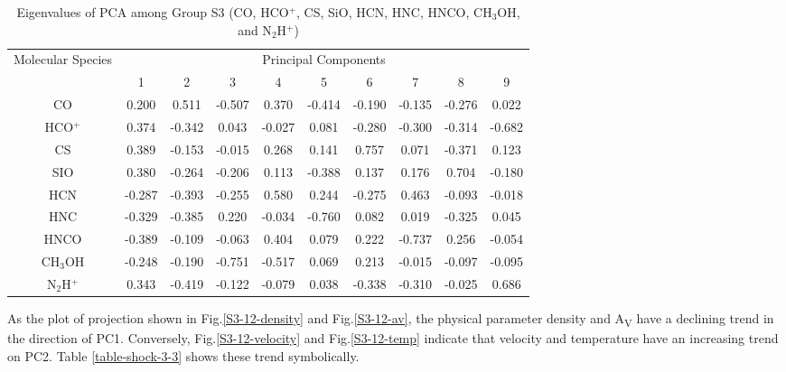 \documentclass{aa}
\begin{document}
\begin{CJK*}{UTF8}{gbsn}
\begin{table}[htbp]
\centering
\begin{tabular}{cccccccccc}
\hline\hline
\multirow{2}{*}{Molecular Species} & \multicolumn{9}{c}{Principal Components}                 \\ \cline{2-10} 
                                   & 1       & 2       & 3       & 4       & 5      & 6    & 7       & 8      & 9   \\ \hline
CO    & 0.200  & 0.511  & -0.507 & 0.370  & -0.414 & -0.190 & -0.135 & -0.276 & 0.022  \\ \hline
HCO$^+$     & 0.374  & -0.342 & 0.043  & -0.027  & 0.081   & -0.280 & -0.300    & -0.314 & -0.682  \\ \hline
CS    & 0.389  & -0.153 & -0.015 & 0.268  & 0.141  & 0.757  & 0.071  & -0.371 & 0.123 \\ \hline
SIO   & 0.380  & -0.264 & -0.206  & 0.113  & -0.388 & 0.137   & 0.176  & 0.704  & -0.180 \\ \hline
HCN   & -0.287 & -0.393 & -0.255 & 0.580  & 0.244  & -0.275 & 0.463  & -0.093 & -0.018 \\ \hline
HNC   & -0.329 & -0.385 & 0.220  & -0.034 & -0.760 & 0.082  & 0.019  & -0.325 & 0.045 \\ \hline
HNCO  & -0.389 & -0.109 & -0.063 & 0.404  & 0.079  & 0.222  & -0.737 & 0.256  & -0.054 \\ \hline
CH$_3$OH & -0.248 & -0.190 & -0.751 & -0.517 & 0.069  & 0.213  & -0.015 & -0.097 & -0.095 \\ \hline
N$_2$H$^+$  & 0.343  & -0.419 & -0.122 & -0.079 & 0.038  & -0.338 & -0.310 & -0.025 & 0.686 \\ \hline\hline
\end{tabular}
\caption{Eigenvalues of PCA among Group S3 (CO, HCO$^+$, CS, SiO, HCN, HNC, HNCO, CH$_3$OH, and N$_2$H$^+$)}
\label{table-shock-3-eigen}
\end{table}


    As the plot of projection shown in Fig.\ref{S3-12-density} and Fig.\ref{S3-12-av}, the physical parameter density and A\textsubscript{V} have a declining trend in the direction of PC1. 
    Conversely, Fig.\ref{S3-12-velocity} and Fig.\ref{S3-12-temp} indicate that velocity and temperature have an increasing trend on PC2. 
    Table \ref{table-shock-3-3} shows these trend symbolically. 


\end{CJK*}
\end{document}
